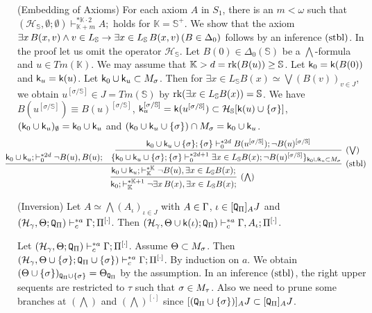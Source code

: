 \documentclass{article}
\newcommand{\mS}{\mathbb{S}}
\newcommand{\mK}{\mathbb{K}}
\begin{document}
\blem\label{th:embedpi11}{\rm (Embedding of Axioms)}
For each axiom $A$ in $S_{1}$, there is an $m<\omega$ such that  
 $(\mathcal{H}_{\mS},\emptyset;\emptyset)\vdash^{* \mathbb{K}\cdot 2}_{\mathbb{K}+m} A;$
holds for $\mK=\mS^{+}$.
\elem
\bprf
We show that the axiom $\exi x\, B(x,v) \land v\in L_{\mathbb{S}} \to \exi x\in L_{\mS}\, B(x,v)\,(B\in\Del_{0})$ follows 
by an inference $({\rm stbl})$.
In the proof let us omit the operator $\mathcal{H}_{\mS}$.
Let $B(0)\in\Delta_{0}(\mathbb{S})$ be a $\bigwedge$-formula 
and $u\in Tm(\mathbb{K})$.
We may assume that
$\mK>d={\rm rk}(B(u))\geq\mathbb{S}$.
Let ${\sf k}_{0}={\sf k}(B(0))$ and ${\sf k}_{u}={\sf k}(u)$.
Let ${\sf k}_{0}\cup{\sf k}_{u}\subset M_{\sigma}$.
Then for $\exists x\in L_{\mathbb{S}}B(x)\simeq\bigvee(B(v))_{v\in J}$, we obtain
$
u^{[\sigma/\mathbb{S}]}\in J=Tm(\mathbb{S})
$ by $\rk(\exists x\in L_{\mathbb{S}}B(x))=\mS$.
We have
$B(u^{[\sigma/\mathbb{S}]})\equiv B(u)^{[\sigma/\mathbb{S}]}$,
$\sfk_{u}^{[\sig/\mS]}=\sfk(u^{[\sig/\mS]})\subset\calh_{\mS}[\sfk(u)\cup\{\sig\}]$,
$({\sf k}_{0}\cup{\sf k}_{u})_{\emptyset}={\sf k}_{0}\cup{\sf k}_{u}$ and
$({\sf k}_{0}\cup{\sf k}_{u}\cup\{\sigma\})\cap M_{\sigma}={\sf k}_{0}\cup{\sf k}_{u}$.
{\small
\[
\hspace{-5mm}
\infer[(\bigwedge)]{ {\sf k}_{0};\vdash^{* \mathbb{K}+1}_{\mathbb{K}}
 \lnot \exists x\, B(x),\exists x\in L_{\mathbb{S}}B(x);}
 {
 \infer[({\rm stbl})]{{\sf k}_{0}\cup{\sf k}_{u}; \vdash^{* \mathbb{K}}_{\mathbb{K}}
    \lnot B(u),\exists x\in L_{\mathbb{S}}B(x);}
    {
     {\sf k}_{0}\cup{\sf k}_{u}; \vdash^{* 2d}_{0}\lnot B(u),B(u);
    &
    \{
    \infer[(\bigvee)]{{\sf k}_{0}\cup\sfk_{u}\cup\{\sig\};\{\sig\}\vdash^{* 2d+1}_{0}
     \exists x\in L_{\mathbb{S}}B(x);\lnot B(u)^{[\sigma/\mathbb{S}]}
     \}_{{\sf k}_{0}\cup{\sf k}_{u}\subset M_{\sigma}}
     }
     {
     {\sf k}_{0}\cup{\sf k}_{u}\cup\{\sig\};\{\sig\} \vdash^{* 2d}_{0}
      B(u^{[\sigma/\mathbb{S}]}); \lnot B(u)^{[\sigma/\mathbb{S}]}
     }
    }
 }
\]
}
\eprf

\bprp\label{lem:inversionpi11}{\rm (Inversion)}
Let
$A\simeq \bigwedge(A_{\iota})_{\iota\in J}$ with $A\in\Gamma$, $\iota\in [{\tt Q}_{\Pi}]_{A}J$ and
$(\mathcal{H}_{\gamma},\Theta;{\tt Q}_{\Pi})\vdash^{* a}_{c}\Gamma;\Pi^{[\cdot]}$.
Then
$(\mathcal{H}_{\gamma},\Theta\cup{\sf k}(\iota);{\tt Q}_{\Pi}
)
\vdash^{* a}_{c}
\Gamma,A_{\iota};\Pi^{[\cdot]}$.
\eprp

\bprp\label{lem:prereduction}
Let $(\mathcal{H}_{\gamma},\Theta;{\tt Q}_{\Pi})\vdash^{* a}_{c}\Gamma;\Pi^{[\cdot]}$.
Assume 
$\Theta\subset M_{\sigma}$.
Then
\\
$(\mathcal{H}_{\gamma},\Theta\cup\{\sigma\};{\tt Q}_{\Pi}\cup\{\sigma\})\vdash^{* a}_{c}\Gamma;\Pi^{[\cdot]}$.
\eprp
\bprf
By induction on $a$.
We obtain
$(\Theta\cup\{\sigma\})_{{\tt Q}_{\Pi}\cup\{\sigma\}}=\Theta_{{\tt Q}_{\Pi}}$ 
by the assumption.
In an inference $({\rm stbl})$,
the right upper sequents are restricted to $\tau$ such that
$\sigma\in M_{\tau}$.
Also we need to prune some branches at $(\bigwedge)$ and $(\bigwedge)^{[\cdot]}$
since $[({\tt Q}_{\Pi}\cup\{\sigma\})]_{A}J\subset [{\tt Q}_{\Pi}]_{A}J$.
\eprf
\end{document}
